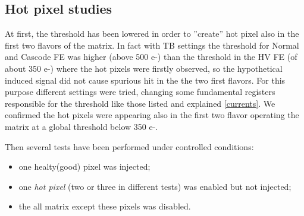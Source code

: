 





\subsection{Hot pixel studies}


At first, the threshold has been lowered in order to ''create'' hot pixel also in the first two flavors of the matrix. In fact with TB settings the threshold for Normal and Cascode FE was higher (above 500 e-) than the threshold in the HV FE (of about 350 e-) where the hot pixels were firstly observed, so the hypothetical induced signal did not cause spurious hit in the the two first flavors. For this purpose different settings were tried, changing some fundamental registers responsible for the threshold like those listed and explained \autoref{currents}. 
We confirmed the hot pixels were appearing also in the first two flavor operating the matrix at a global threshold below 350 e-. 


Then several tests have been performed under controlled conditions:
\begin{itemize}
\item one healty(good) pixel was injected;
\item one \textit{hot pixel} (two or three in different tests) was enabled but not injected;
\item the all matrix except these pixels was disabled.
\end{itemize}


